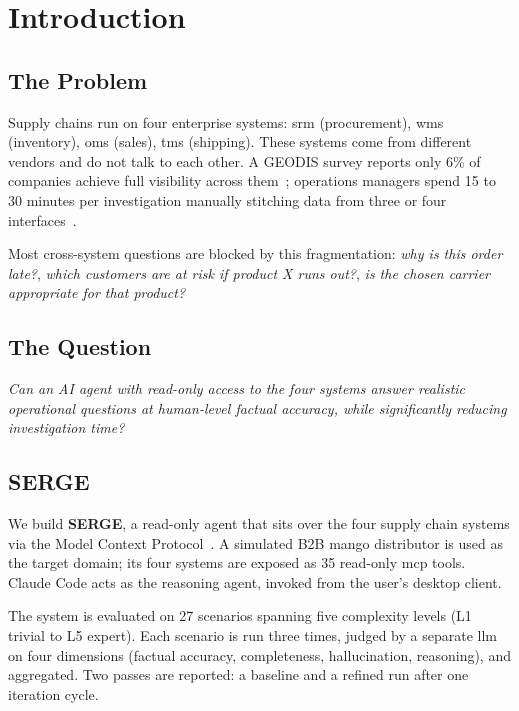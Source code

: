 
\chapter{Introduction}
\label{ch:intro}

\section{The Problem}

Supply chains run on four enterprise systems: \gls{srm} (procurement), \gls{wms} (inventory), \gls{oms} (sales), \gls{tms} (shipping). These systems come from different vendors and do not talk to each other. A GEODIS survey reports only 6\% of companies achieve full visibility across them~\cite{geodis2024}; operations managers spend 15 to 30 minutes per investigation manually stitching data from three or four interfaces~\cite{aws2024sync,omniful2026}.

Most cross-system questions are blocked by this fragmentation: \emph{why is this order late?}, \emph{which customers are at risk if product X runs out?}, \emph{is the chosen carrier appropriate for that product?}

\section{The Question}

\emph{Can an AI agent with read-only access to the four systems answer realistic operational questions at human-level factual accuracy, while significantly reducing investigation time?}

\section{SERGE}

We build \textbf{SERGE}, a read-only agent that sits over the four supply chain systems via the Model Context Protocol~\cite{mcp2024}. A simulated B2B mango distributor is used as the target domain; its four systems are exposed as 35 read-only \gls{mcp} tools. Claude Code acts as the reasoning agent, invoked from the user's desktop client.

The system is evaluated on 27 scenarios spanning five complexity levels (L1 trivial to L5 expert). Each scenario is run three times, judged by a separate \gls{llm} on four dimensions (factual accuracy, completeness, hallucination, reasoning), and aggregated. Two passes are reported: a baseline and a refined run after one iteration cycle.


